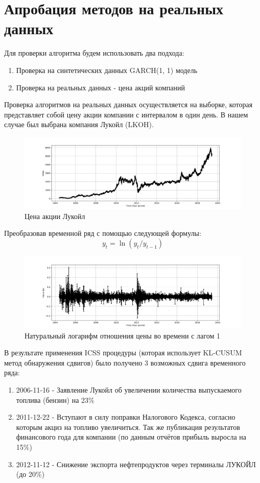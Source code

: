 \documentclass[a4paper,14pt,russian]{extarticle}
\begin{document}
	\section{\label{sec:sec3}Апробация методов на реальных данных}
	Для проверки алгоритма будем использовать два подхода:
	\begin{enumerate}
		\item Проверка на синтетических данных GARCH(1, 1) модель
		\item Проверка на реальных данных - цена акций компаний
	\end{enumerate}
	\par
	Проверка алгоритмов на реальных данных осуществляется на выборке, которая представляет собой цену акции компании с интервалом в один день. В нашем случае был выбрана компания Лукойл (LKOH).
	\begin{figure}[H]
		\includegraphics[width=\linewidth]{source_ts_LKOH.png}
		\caption{\label{fig:fig1} Цена акции Лукойл}
	\end{figure}
	Преобразовав временной ряд с помощью следующей формулы:
	\begin{equation}
		y_t = \ln(y_t / y_{t-1})
	\end{equation}
	\begin{figure}[H]
		\includegraphics[width=\linewidth]{source_ln_ts_LKOH.png}
		\caption{\label{fig:fig2} Натуральный логарифм отношения цены во времени с лагом 1}
	\end{figure}
	В результате применения ICSS процедуры (которая использует KL-CUSUM метод обнаружения сдвигов) было получено 3 возможных сдвига временного ряда:
	\begin{enumerate}
		\item 2006-11-16 - Заявление Лукойл об увеличении количества выпускаемого топлива (бензин) на 23\%
		\item 2011-12-22 - Вступают в силу поправки Налогового Кодекса, согласно которым акциз на топливо увеличиться. Так же публикация результатов финансового года для компании (по данным отчётов прибыль выросла на 15\%)
		\item 2012-11-12 - Снижение экспорта нефтепродуктов через терминалы ЛУКОЙЛ (до 20\%)
	\end{enumerate}
\end{document}
